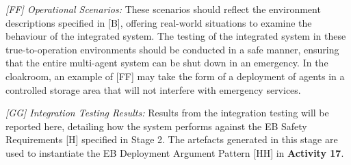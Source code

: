 \documentclass[runningheads]{llncs}
\begin{document}
\emph{[FF] Operational Scenarios:} These scenarios should reflect the environment descriptions specified in [B], offering real-world situations to examine the behaviour of the integrated system. The testing of the integrated system in these true-to-operation environments should be conducted in a safe manner, ensuring that the entire multi-agent system can be shut down in an emergency. 
In the cloakroom, an example of [FF] may take the form of a deployment of agents in a controlled storage area that will not interfere with emergency services.
%
%

\emph{[GG] Integration Testing Results:} Results from the integration testing will be reported here, detailing how the system performs against the EB Safety Requirements [H] specified in Stage 2. 
The artefacts generated in this stage are used to instantiate the EB Deployment Argument Pattern [HH] in \textbf{Activity 17}.
\end{document}
